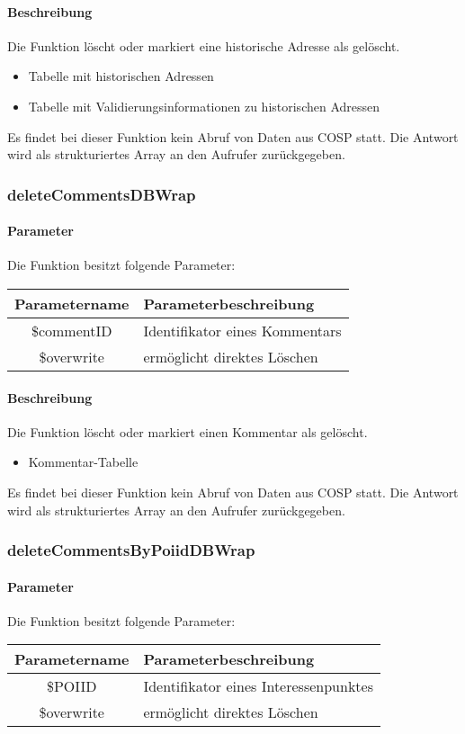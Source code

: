 \paragraph{Beschreibung} Die Funktion löscht oder markiert eine historische Adresse als gelöscht.
\begin{itemize}
	\item Tabelle mit historischen Adressen
	\item Tabelle mit Validierungsinformationen zu historischen Adressen
\end{itemize}
Es findet bei dieser Funktion kein Abruf von Daten aus {\glqq COSP\grqq} statt. Die Antwort wird als strukturiertes Array an den Aufrufer zurückgegeben.
\subsubsection{deleteCommentsDBWrap}
\paragraph{Parameter} Die Funktion besitzt folgende Parameter:
\begin{table}[H]
	\begin{tabular}{|c|p{11cm}|}
		\hline
		\textbf{Parametername} & \textbf{Parameterbeschreibung} \\ \hline
		\$commentID & Identifikator eines Kommentars \\ \hline
		\$overwrite & ermöglicht direktes Löschen \\ \hline
	\end{tabular}
\end{table}
\paragraph{Beschreibung} Die Funktion löscht oder markiert einen Kommentar als gelöscht.
\begin{itemize}
	\item Kommentar-Tabelle
\end{itemize}
Es findet bei dieser Funktion kein Abruf von Daten aus {\glqq COSP\grqq} statt. Die Antwort wird als strukturiertes Array an den Aufrufer zurückgegeben.
\subsubsection{deleteCommentsByPoiidDBWrap}
\paragraph{Parameter} Die Funktion besitzt folgende Parameter:
\begin{table}[H]
	\begin{tabular}{|c|p{11cm}|}
		\hline
		\textbf{Parametername} & \textbf{Parameterbeschreibung} \\ \hline
		\$POIID     & Identifikator eines Interessenpunktes \\ \hline
		\$overwrite & ermöglicht direktes Löschen \\ \hline
	\end{tabular}
\end{table}
